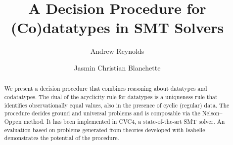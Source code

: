 \usepackage[
   a4paper,
   pdftex,
   pdftitle={A Decision Procedure for (Co)datatypes in SMT Solvers},
   pdfauthor={Andrew Reynolds and Jasmin Christian Blanchette},
   pdfkeywords={},
   pdfborder={0 0 0},
   draft=false,
   bookmarksnumbered,
   bookmarks,
   bookmarksdepth=2,
   bookmarksopenlevel=2,
   bookmarksopen]{hyperref}


\global\def\figurename{Figure}
\global\def\figuresname{Figures}


\makeatletter
\ps@myheadings
\makeatother







\title{A Decision Procedure for (Co)datatypes in SMT Solvers}

\author {Andrew Reynolds \and Jasmin Christian Blanchette}

\maketitle

\smallskipamount

\begin{nomemoriam}
\noindent\hfill\emph{\phantom{In memoriam Morgan Deters 1979--2015}}

\vspace*{-6\smallskipamount}
\end{nomemoriam}
\begin{memoriam}
\noindent\hfill\emph{}
\end{memoriam}

\begin{abstract}
We present a decision procedure that combines reasoning about
datatypes and codatatypes. The dual of the acyclicity rule for datatypes is a
uniqueness rule that identifies observationally equal values, also in the presence of cyclic
(regular) data. The procedure decides ground and universal
problems and is composable via the Nelson--Oppen method. It has been
implemented in CVC4, a state-of-the-art SMT solver. An evaluation based on
problems generated from theories developed with Isabelle demonstrates the
potential of the procedure.
\end{abstract}

